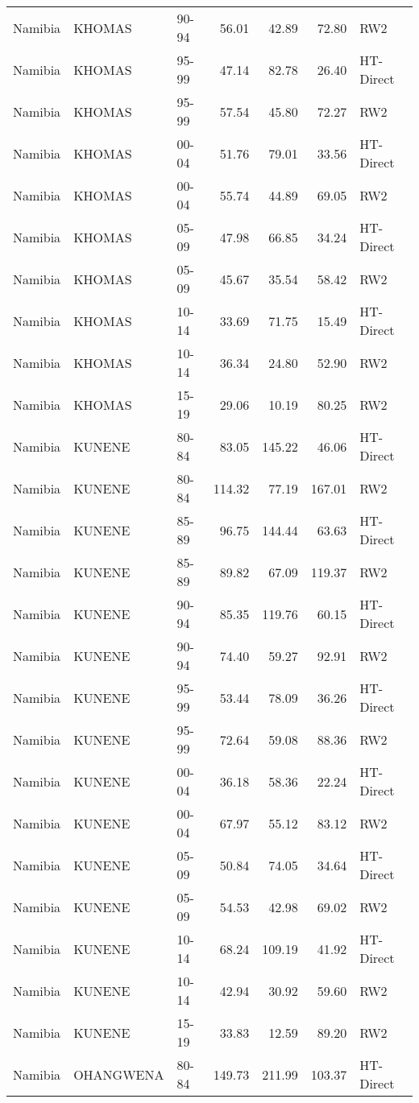 \begin{longtable}{lllrrrl}
  Namibia & KHOMAS & 90-94 & 56.01 & 42.89 & 72.80 & RW2 \\ 
  Namibia & KHOMAS & 95-99 & 47.14 & 82.78 & 26.40 & HT-Direct \\ 
  Namibia & KHOMAS & 95-99 & 57.54 & 45.80 & 72.27 & RW2 \\ 
  Namibia & KHOMAS & 00-04 & 51.76 & 79.01 & 33.56 & HT-Direct \\ 
  Namibia & KHOMAS & 00-04 & 55.74 & 44.89 & 69.05 & RW2 \\ 
  Namibia & KHOMAS & 05-09 & 47.98 & 66.85 & 34.24 & HT-Direct \\ 
  Namibia & KHOMAS & 05-09 & 45.67 & 35.54 & 58.42 & RW2 \\ 
  Namibia & KHOMAS & 10-14 & 33.69 & 71.75 & 15.49 & HT-Direct \\ 
  Namibia & KHOMAS & 10-14 & 36.34 & 24.80 & 52.90 & RW2 \\ 
  Namibia & KHOMAS & 15-19 & 29.06 & 10.19 & 80.25 & RW2 \\ 
  Namibia & KUNENE & 80-84 & 83.05 & 145.22 & 46.06 & HT-Direct \\ 
  Namibia & KUNENE & 80-84 & 114.32 & 77.19 & 167.01 & RW2 \\ 
  Namibia & KUNENE & 85-89 & 96.75 & 144.44 & 63.63 & HT-Direct \\ 
  Namibia & KUNENE & 85-89 & 89.82 & 67.09 & 119.37 & RW2 \\ 
  Namibia & KUNENE & 90-94 & 85.35 & 119.76 & 60.15 & HT-Direct \\ 
  Namibia & KUNENE & 90-94 & 74.40 & 59.27 & 92.91 & RW2 \\ 
  Namibia & KUNENE & 95-99 & 53.44 & 78.09 & 36.26 & HT-Direct \\ 
  Namibia & KUNENE & 95-99 & 72.64 & 59.08 & 88.36 & RW2 \\ 
  Namibia & KUNENE & 00-04 & 36.18 & 58.36 & 22.24 & HT-Direct \\ 
  Namibia & KUNENE & 00-04 & 67.97 & 55.12 & 83.12 & RW2 \\ 
  Namibia & KUNENE & 05-09 & 50.84 & 74.05 & 34.64 & HT-Direct \\ 
  Namibia & KUNENE & 05-09 & 54.53 & 42.98 & 69.02 & RW2 \\ 
  Namibia & KUNENE & 10-14 & 68.24 & 109.19 & 41.92 & HT-Direct \\ 
  Namibia & KUNENE & 10-14 & 42.94 & 30.92 & 59.60 & RW2 \\ 
  Namibia & KUNENE & 15-19 & 33.83 & 12.59 & 89.20 & RW2 \\ 
  Namibia & OHANGWENA & 80-84 & 149.73 & 211.99 & 103.37 & HT-Direct \\ 

\end{longtable}
